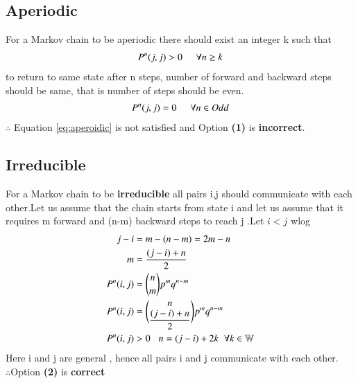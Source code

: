 \documentclass[journal,12pt,twocolumn]{IEEEtran}
\begin{document}
\subsection{Aperiodic}
For a Markov chain to be aperiodic there should exist an integer k such that
\begin{align}
P^n(j,j) > 0 \hspace{0.5cm} \forall n \geq k \label{eq:aperoidic}
\end{align} 
to return to same state after n steps, number of forward and backward steps should be same, that is number of steps should be even. 
\begin{align}
P^n(j,j) = 0 \hspace{0.5cm} \forall n \in Odd \label{eq:1}
\end{align}
$\therefore$ Equation \eqref{eq:aperoidic} is not satisfied and Option \textbf{(1)} is \textbf{incorrect}.
\subsection{Irreducible}
For a Markov chain to be \textbf{irreducible} all pairs i,j should communicate with each other.Let us assume that the chain starts from state i and let us assume that it requires m forward and (n-m) backward steps to reach j .Let $i < j$ wlog 
\begin{align}
j - i &= m - (n - m) = 2m - n\\
m &= \frac{(j - i) + n}{2}\\
P^n(i,j) &= \binom{n}{m} p^m q^{n-m}\\
P^n(i,j) &= \binom{n}{\dfrac{(j - i) + n}{2}} p^m q^{n-m}\\
P^n(i,j) &> 0 \hspace{0.3cm}  n = (j-i)+2k \hspace{0.2cm} \forall k \in \mathbb{W}
\end{align}
Here i and j are general , hence all pairs i and j communicate with each other.\\
$\therefore$Option \textbf{(2)} is \textbf{correct}
\end{document}
